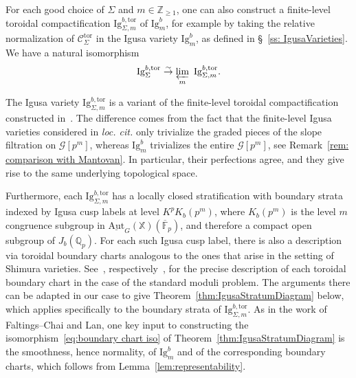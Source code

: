 \documentclass[letterpaper,11pt]{amsart}
\begin{document}
For each good choice of $\Sigma$ and $m\in \mathbb{Z}_{\geq 1}$, one can also construct a finite-level toroidal compactification $\mathrm{Ig}^{b,\mathrm{tor}}_{\Sigma, m}$ of $\mathrm{Ig}^{b}_m$, for example by taking the relative normalization of $\mathscr{C}^{\mathrm{tor}}_{\Sigma}$ in the Igusa variety $\mathrm{Ig}^b_m$, as defined in \S~\ref{ss: IgusaVarieties}. We have a natural isomorphism 
\[
\mathrm{Ig}^{b,\mathrm{tor}}_{\Sigma} \stackrel{\sim}{\to}
\varprojlim_m\ \mathrm{Ig}^{b,\mathrm{tor}}_{\Sigma,m}.
\]

\begin{remark}
The Igusa variety $\mathrm{Ig}^{b,\mathrm{tor}}_{\Sigma, m}$ is a variant of the finite-level toroidal compactification constructed in~\cite{CS2, santos}. The difference comes from the fact that the finite-level Igusa varieties considered in \emph{loc. cit.} only trivialize the graded pieces of the slope filtration on $\mathscr{G}[p^m]$, whereas $\mathrm{Ig}^b_m$ trivializes the entire $\mathscr{G}[p^m]$, see Remark~\ref{rem: comparison with Mantovan}. In particular, their perfections agree, and they give rise to the same underlying topological space. 
\end{remark}

 Furthermore, each $\mathrm{Ig}^{b,\mathrm{tor}}_{\Sigma,m}$ has a locally closed stratification with boundary strata indexed by Igusa cusp labels at level $K^pK_b(p^m)$, where $K_b(p^m)$ is the level $m$ congruence subgroup in $\underline{\mathrm{Aut}}_G(\mathbb{X})(\overline{\mathbb{F}}_p)$, and therefore a compact open subgroup of $J_b(\mathbb{Q}_p)$. For each such Igusa cusp label, there is also a description via toroidal boundary charts analogous to the ones that arise in the setting of Shimura varieties. See~\cite[Theorem 3.3.12]{CS2}, respectively~\cite[Theorem 3.2.18]{santos}, for the precise description of each toroidal boundary chart in the case of the standard moduli problem. The arguments there can be adapted in our case to give Theorem~\ref{thm:IgusaStratumDiagram} below, which applies specifically to the boundary strata of $\mathrm{Ig}^{b,\mathrm{tor}}_{\Sigma, m}$. As in the work of Faltings--Chai and Lan, one key input to constructing the isomorphism~\eqref{eq:boundary chart iso} of Theorem~\ref{thm:IgusaStratumDiagram} is the smoothness, hence normality, of $\mathrm{Ig}^b_{m}$ and of the corresponding boundary charts, which follows from Lemma~\ref{lem:representability}.   
\end{document}

